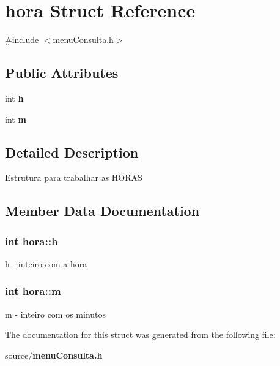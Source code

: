\section{hora Struct Reference}
\label{structhora}


{\ttfamily \#include $<$menu\+Consulta.\+h$>$}

\subsection*{Public Attributes}
\begin{DoxyCompactItemize}
\item 
int {\bf h}
\item 
int {\bf m}
\end{DoxyCompactItemize}


\subsection{Detailed Description}
Estrutura para trabalhar as H\+O\+R\+A\+S 

\subsection{Member Data Documentation}
\subsubsection[{h}]{\setlength{\rightskip}{0pt plus 5cm}int hora\+::h}\label{structhora_ad7e289364b8daa991a4a5f185aaf562f}
h -\/ inteiro com a hora 
\subsubsection[{m}]{\setlength{\rightskip}{0pt plus 5cm}int hora\+::m}\label{structhora_a0b89c6b3e26e4da93cf468d77ba3b0b8}
m -\/ inteiro com os minutos 

The documentation for this struct was generated from the following file\+:\begin{DoxyCompactItemize}
\item 
source/{\bf menu\+Consulta.\+h}\end{DoxyCompactItemize}
